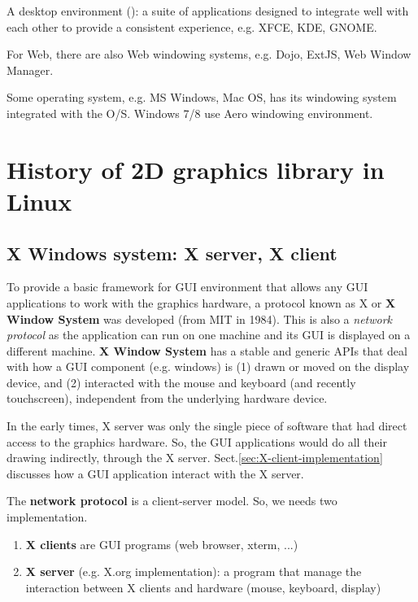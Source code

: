 A desktop environment (): a suite of applications designed to integrate well
with each other to provide a consistent experience, e.g. XFCE, KDE, GNOME.

For Web, there are also Web windowing systems, e.g. Dojo, ExtJS, Web Window
Manager. 
  
Some operating system, e.g. MS Windows, Mac OS, has its windowing system
integrated with the O/S. Windows 7/8 use Aero windowing environment.
   
\section{History of 2D graphics library in Linux}
\label{sec:2D-graphics-Linux}

\subsection{X Windows system: X server, X client}
\label{sec:X-protocol}
\label{sec:X-system}
\label{sec:display-server}

To provide a basic framework for GUI environment that allows any GUI
applications to work with the graphics hardware, a protocol known as X or {\bf X
Window System} was developed (from MIT in 1984).
This is also a {\it network protocol} as the application can run on one machine
and its GUI is displayed on a different machine.
{\bf X Window System} has a stable and generic APIs that deal with how a GUI
component (e.g. windows) is (1) drawn or moved on the display device, and (2)
interacted with the mouse and keyboard (and recently touchscreen), independent
from the underlying hardware device.

In the early times, X server was only the single piece of software that had
direct access to the graphics hardware.
So, the GUI applications would do all their drawing indirectly, through the X
server. Sect.\ref{sec:X-client-implementation} discusses how a GUI application
interact with the X server.

The  {\bf network protocol} is a client-server model. So, we needs two
implementation. 
\begin{enumerate}
\item {\bf X clients} are GUI programs (web browser, xterm, ...)

\item {\bf X server} (e.g. X.org implementation): a program that manage the
interaction between X clients and hardware (mouse, keyboard, display)
\end{enumerate}

